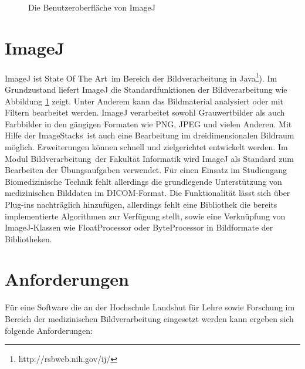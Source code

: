 \begin{figure}[htbp]
  \vspace{0.5cm}
  \centering
  \caption{Die Benutzeroberfläche von ImageJ}
  \label{imagej}
  \vspace{0.5cm}
\end{figure}

\section{ImageJ}

ImageJ ist \glqq State Of The Art\grqq\ im Bereich der Bildverarbeitung in Java\footnote{http://rsbweb.nih.gov/ij/}). Im Grundzustand liefert ImageJ die Standardfunktionen der Bildverarbeitung wie Abbildung \ref{imagej} zeigt. Unter Anderem kann das Bildmaterial analysiert oder mit Filtern bearbeitet werden. ImageJ verarbeitet sowohl Grauwertbilder als auch Farbbilder in den gängigen Formaten wie PNG, JPEG und vielen Anderen. Mit Hilfe der \glqq ImageStacks\grqq\ ist auch eine Bearbeitung im dreidimensionalen Bildraum möglich. Erweiterungen können schnell und zielgerichtet entwickelt werden. Im Modul \glqq Bildverarbeitung\grqq\ der Fakultät Informatik wird ImageJ als Standard zum Bearbeiten der Übungsaufgaben verwendet. Für einen Einsatz im Studiengang Biomedizinische Technik fehlt allerdings die grundlegende Unterstützung von medizinischen Bilddaten im DICOM-Format. Die Funktionalität lässt sich über Plug-ins nachträglich hinzufügen, allerdings fehlt eine Bibliothek die bereits implementierte Algorithmen zur Verfügung stellt, sowie eine Verknüpfung von ImageJ-Klassen wie FloatProcessor oder ByteProcessor in Bildformate der Bibliotheken.

\section{Anforderungen}

Für eine Software die an der Hochschule Landshut für Lehre sowie Forschung im Bereich der medizinischen Bildverarbeitung eingesetzt werden kann ergeben sich folgende Anforderungen:

